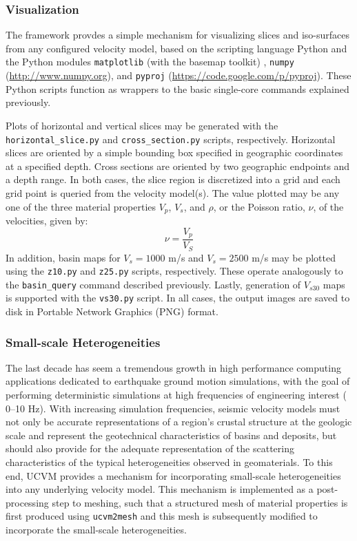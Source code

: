 \subsubsection{Visualization}

The framework provdes a simple mechanism for visualizing slices and iso-surfaces from any configured velocity model, based on the scripting language Python and the Python modules \texttt{matplotlib} (with the basemap toolkit) \citep{Hunter_2007_CSE}, \texttt{numpy} (\url{http://www.numpy.org}), and \texttt{pyproj} (\url{https://code.google.com/p/pyproj}). These Python scripts function as wrappers to the basic single-core commands explained previously.

Plots of horizontal and vertical slices may be generated with the \texttt{horizontal\_slice.py} and \texttt{cross\_section.py} scripts, respectively. Horizontal slices are oriented by a simple bounding box specified in geographic coordinates at a specified depth. Cross sections are oriented by two geographic endpoints and a depth range. In both cases, the slice region is discretized into a grid and each grid point is queried from the velocity model(s). The value plotted may be any one of the three material properties $V_p$, $V_s$, and $\rho$, or the Poisson ratio, $\nu$, of the velocities, given by:
\begin{equation}
\nu = \frac{V_p}{V_S}
\end{equation}
In addition, basin maps for $V_s = 1000$ m/s and $V_s = 2500$ m/s may be plotted using the \texttt{z10.py} and \texttt{z25.py} scripts, respectively. These operate analogously to the \texttt{basin\_query} command described previously. Lastly, generation of $V_{s30}$ maps is supported with the \texttt{vs30.py} script. In all cases, the output images are saved to disk in Portable Network Graphics (PNG) format.

\subsubsection{Small-scale Heterogeneities}

The last decade has seem a tremendous growth in high performance computing applications dedicated to earthquake ground motion simulations, with the goal of performing deterministic simulations at high frequencies of engineering interest (\fmax{} 0--10 Hz). With increasing simulation frequencies, seismic velocity models must not only be accurate representations of a region's crustal structure at the geologic scale and represent the geotechnical characteristics of basins and deposits, but should also provide for the adequate representation of the scattering characteristics of the typical heterogeneities observed in geomaterials. To this end, UCVM provides a mechanism for incorporating small-scale heterogeneities into any underlying velocity model. This mechanism is implemented as a post-processing step to meshing, such that a structured mesh of material properties is first produced using \texttt{ucvm2mesh} and this mesh is subsequently modified to incorporate the small-scale heterogeneities.

